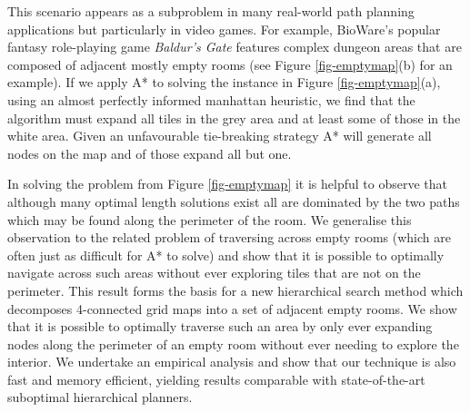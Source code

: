 This scenario appears as a subproblem in many real-world path planning applications but particularly
in video games.
For example, BioWare's popular fantasy role-playing game \emph{Baldur's Gate} features complex dungeon
 areas that are composed of adjacent mostly empty rooms (see Figure \ref{fig-emptymap}(b) for an example).
If we apply A* \cite{hart68} to solving the instance in Figure \ref{fig-emptymap}(a), using an almost 
perfectly informed manhattan heuristic, we find that the algorithm must expand all tiles in the grey 
area and at least some of those in the white area.
Given an unfavourable tie-breaking strategy A* will generate all nodes on the map and of those expand 
all but one.
\par
In solving the problem from Figure \ref{fig-emptymap} it is helpful to observe that although many optimal 
length solutions exist all are dominated by the two paths which may be found along the perimeter of 
the room. 
We generalise this observation to the related problem of traversing across empty rooms (which are 
often just as difficult for A* to solve) and show that it is possible to optimally navigate across 
such areas without ever exploring tiles that are not on the perimeter.
This result forms the basis for a new hierarchical search method which decomposes 4-connected grid maps
into a set of adjacent empty rooms. 
We show that it is possible to optimally traverse such an area by only ever expanding nodes along the
perimeter of an empty room without ever needing to explore the interior.
We undertake an empirical analysis and show that our technique is also fast and memory efficient,
yielding results comparable with state-of-the-art suboptimal hierarchical planners.
